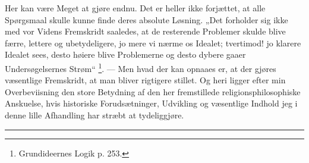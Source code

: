 \documentclass[12pt,a4paper]{book}
\begin{document}
Her kan være Meget at gjøre endnu. Det er heller ikke
forjættet, at alle Spørgsmaal skulle kunne finde deres absolute
Løsning. „Det forholder sig ikke med vor Videns Fremskridt
saaledes, at de resterende Problemer skulde blive færre, lettere
og ubetydeligere, jo mere vi nærme os Idealet; tvertimod! jo
klarere Idealet sees, desto høiere blive Problemerne og desto
dybere gaaer Undersøgelsernes Strøm“%
\footnote{Grundideernes Logik p. 253.}. --- Men hvad der
kan opnaaes er, at der gjøres væsentlige Fremskridt, at man
bliver rigtigere stillet. Og heri ligger efter min Overbeviisning
den store Betydning af den her fremstillede religionsphilosophiske
Anskuelse, hvis historiske Forudsætninger, Udvikling og
væsentlige Indhold jeg i denne lille Afhandling har stræbt at
tydeliggjøre.

\begin{center}\rule{0.2\textwidth}{0.8pt}\end{center}
\end{document}
